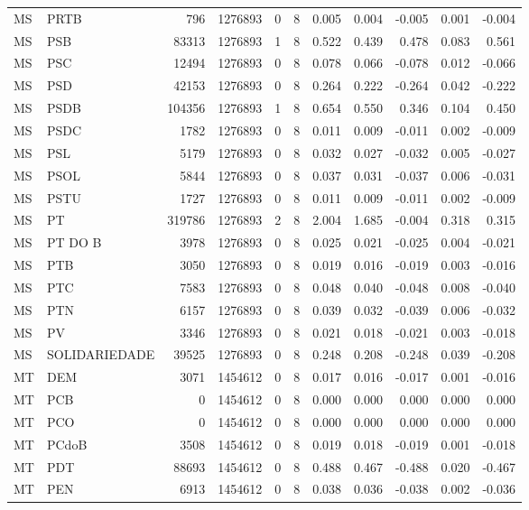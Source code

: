 \begin{landscape}
\begin{longtable}{llrrrrrrrrr}
MS & PRTB & 796 & 1276893 & 0 & 8 & 0.005 & 0.004 & -0.005 & 0.001 & -0.004 \\
MS & PSB & 83313 & 1276893 & 1 & 8 & 0.522 & 0.439 & 0.478 & 0.083 & 0.561 \\
MS & PSC & 12494 & 1276893 & 0 & 8 & 0.078 & 0.066 & -0.078 & 0.012 & -0.066 \\
MS & PSD & 42153 & 1276893 & 0 & 8 & 0.264 & 0.222 & -0.264 & 0.042 & -0.222 \\
MS & PSDB & 104356 & 1276893 & 1 & 8 & 0.654 & 0.550 & 0.346 & 0.104 & 0.450 \\
MS & PSDC & 1782 & 1276893 & 0 & 8 & 0.011 & 0.009 & -0.011 & 0.002 & -0.009 \\
MS & PSL & 5179 & 1276893 & 0 & 8 & 0.032 & 0.027 & -0.032 & 0.005 & -0.027 \\
MS & PSOL & 5844 & 1276893 & 0 & 8 & 0.037 & 0.031 & -0.037 & 0.006 & -0.031 \\
MS & PSTU & 1727 & 1276893 & 0 & 8 & 0.011 & 0.009 & -0.011 & 0.002 & -0.009 \\
MS & PT & 319786 & 1276893 & 2 & 8 & 2.004 & 1.685 & -0.004 & 0.318 & 0.315 \\
MS & PT DO B & 3978 & 1276893 & 0 & 8 & 0.025 & 0.021 & -0.025 & 0.004 & -0.021 \\
MS & PTB & 3050 & 1276893 & 0 & 8 & 0.019 & 0.016 & -0.019 & 0.003 & -0.016 \\
MS & PTC & 7583 & 1276893 & 0 & 8 & 0.048 & 0.040 & -0.048 & 0.008 & -0.040 \\
MS & PTN & 6157 & 1276893 & 0 & 8 & 0.039 & 0.032 & -0.039 & 0.006 & -0.032 \\
MS & PV & 3346 & 1276893 & 0 & 8 & 0.021 & 0.018 & -0.021 & 0.003 & -0.018 \\
MS & SOLIDARIEDADE & 39525 & 1276893 & 0 & 8 & 0.248 & 0.208 & -0.248 & 0.039 & -0.208 \\
MT & DEM & 3071 & 1454612 & 0 & 8 & 0.017 & 0.016 & -0.017 & 0.001 & -0.016 \\
MT & PCB & 0 & 1454612 & 0 & 8 & 0.000 & 0.000 & 0.000 & 0.000 & 0.000 \\
MT & PCO & 0 & 1454612 & 0 & 8 & 0.000 & 0.000 & 0.000 & 0.000 & 0.000 \\
MT & PCdoB & 3508 & 1454612 & 0 & 8 & 0.019 & 0.018 & -0.019 & 0.001 & -0.018 \\
MT & PDT & 88693 & 1454612 & 0 & 8 & 0.488 & 0.467 & -0.488 & 0.020 & -0.467 \\
MT & PEN & 6913 & 1454612 & 0 & 8 & 0.038 & 0.036 & -0.038 & 0.002 & -0.036 \\

\end{longtable}
\end{landscape}

